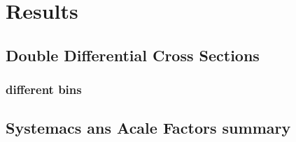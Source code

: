 \chapter{Results}

\section{Double Differential Cross Sections}
\subsection{different bins}

\section{Systemacs ans Acale Factors summary}

